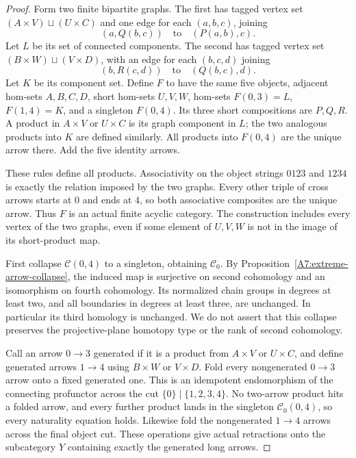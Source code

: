 \begin{proof}
Form two finite bipartite graphs. The first has tagged vertex set
$(A\times V)\sqcup(U\times C)$ and one edge for each $(a,b,c)$,
joining
\[
 (a,Q(b,c))\quad\text{to}\quad(P(a,b),c).
\]
Let $L$ be its set of connected components. The second has tagged
vertex set $(B\times W)\sqcup(V\times D)$, with an edge for each
$(b,c,d)$ joining
\[
 (b,R(c,d))\quad\text{to}\quad(Q(b,c),d).
\]
Let $K$ be its component set. Define $F$ to have the same five
objects, adjacent hom-sets $A,B,C,D$, short hom-sets $U,V,W$,
hom-sets $F(0,3)=L$, $F(1,4)=K$, and a singleton $F(0,4)$.
Its three short compositions are $P,Q,R$. A product in $A\times V$
or $U\times C$ is its graph component in $L$; the two analogous
products into $K$ are defined similarly. All products into $F(0,4)$
are the unique arrow there. Add the five identity arrows.

These rules define all products. Associativity on the object
strings $0123$ and $1234$ is exactly the relation imposed by the
two graphs. Every other triple of cross arrows starts at $0$ and
ends at $4$, so both associative composites are the unique arrow.
Thus $F$ is an actual finite acyclic category. The construction
includes every vertex of the two graphs, even if some element of
$U,V,W$ is not in the image of its short-product map.

First collapse $\mathcal C(0,4)$ to a singleton, obtaining
$\mathcal C_0$. By Proposition~\ref{A7:extreme-arrow-collapse},
the induced map is surjective on second cohomology and an
isomorphism on fourth cohomology. Its normalized chain groups in
degrees at least two, and all boundaries in degrees at least
three, are unchanged. In particular its third homology is
unchanged. We do not assert that this collapse preserves the
projective-plane homotopy type or the rank of second cohomology.

Call an arrow $0\to3$ generated if it is a product from
$A\times V$ or $U\times C$, and define generated arrows $1\to4$
using $B\times W$ or $V\times D$. Fold every nongenerated
$0\to3$ arrow onto a fixed generated one. This is an idempotent
endomorphism of the connecting profunctor across the cut
$\{0\}\mid\{1,2,3,4\}$. No two-arrow product hits a folded
arrow, and every further product lands in the singleton
$\mathcal C_0(0,4)$, so every naturality equation holds.
Likewise fold the nongenerated $1\to4$ arrows across the final
object cut. These operations give actual retractions onto the
subcategory $Y$ containing exactly the generated long arrows.


\end{proof}
